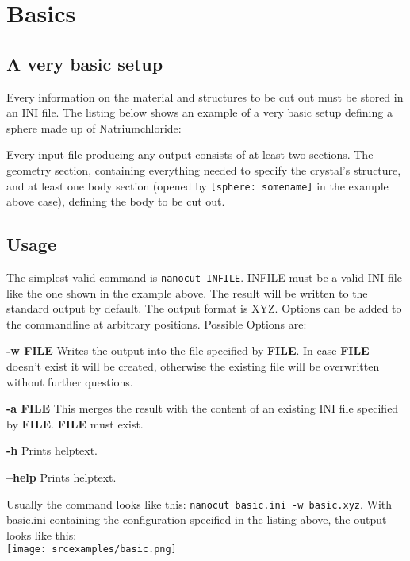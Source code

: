 \section{Basics}
\subsection{A very basic setup}

Every information on the material and structures to be cut out must be stored in an INI file. The listing below shows an example of a very basic setup defining a sphere made up of Natriumchloride:

Every input file producing any output consists of at least two sections. The geometry section, containing everything needed to specify the crystal's structure, and at least one body section (opened by \lstinline{[sphere: somename]} in the example above case), defining the body to be cut out.

\subsection{Usage}
The simplest valid command is \lstinline{nanocut INFILE}. INFILE must be a valid INI file like the one shown in the example above. The result will be written to the standard output by default. The output format is XYZ. Options can be added to the commandline at arbitrary positions. Possible Options are:
\begin{description}
 \item{\textbf{-w FILE}} Writes the output into the file specified by \textbf{FILE}. In case \textbf{FILE} doesn't exist it will be created, otherwise the existing file will be overwritten without further questions.
 \item{\textbf{-a FILE}} This merges the result with the content of an existing INI file specified by \textbf{FILE}. \textbf{FILE} must exist.
 \item{\textbf{-h}} Prints helptext.
 \item{\textbf{--help}} Prints helptext.
\end{description}
Usually the command looks like this: \lstinline{nanocut basic.ini -w basic.xyz}. With basic.ini containing the configuration specified in the listing above, the output looks like this:
\ \\\texttt{[image: srcexamples/basic.png]}

